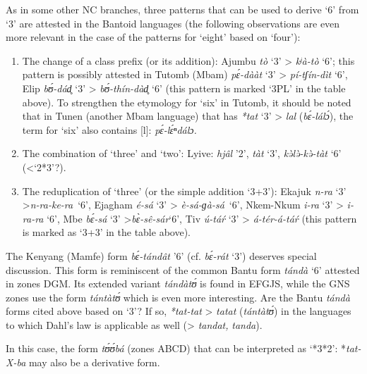 \newpage    
As in some other NC branches, three patterns that can be used to derive `6' from `3' are attested in the Bantoid languages (the following observations are even more relevant in the case of the patterns for `eight' based on `four'):

\begin{enumerate}
\item The change of a class prefix (or its addition): Ajumbu \textit{tò} ‘3’ > \textit{kʲà-tò} ‘6’; this pattern is possibly attested in Tutomb (Mbam) \textit{p{\'{ɛ}}-dààt} ‘3’ > \textit{pí-tʃín-dìt} ‘6’, Elip \textit{b{\'{ʊ}}-dád̥} ‘3’ > \textit{b{\'{ʊ}}-thín-dàd̥} ‘6’ (this pattern is marked ‘3PL’ in the table above). To strengthen the etymology for `six' in Tutomb, it should be noted that in Tunen (another Mbam language) that has \textit{*tat} ‘3’ > \textit{lal} (\textit{b{\'{ɛ}}-lál{\'{ɔ}}}), the term for `six' also contains [l]: \textit{p{\'{ɛ}}-l{\'{ɛ}}ⁿdálɔ.}
  
\item The combination of `three' and `two': Lyive: \textit{hjâl} ’2’, \textit{tàt} ‘3’, \textit{k{\`{ə}}l{\`{ə}}-k{\`{ə}}-tàt} ‘6’ (<‘2*3’?).
\item The reduplication of `three' (or the simple addition ‘3+3’): Ekajuk \textit{n-ra} ‘3’ >\textit{n-ra-ke-ra}~‘6’, Ejagham \textit{é-sá} ‘3’ > \textit{è-sá-ɡà-sá}~‘6’, Nkem-Nkum \textit{i-ra} ‘3’ > \textit{i-ra-ra} ‘6’, Mbe \textit{b{\'{ɛ}}-sá} ‘3’ >\textit{b{\`{ɛ}}-s{\^{e}}-sár}‘6’, Tiv \textit{ú-tá{\'{r}}} ‘3’ > \textit{á-tér-á-tá{\'{r}}} (this pattern is marked as ‘3+3’ in the table above). 
\end{enumerate}
The Kenyang (Mamfe) form \textit{b{\'{ɛ}}-tándât} ’6’ (cf. \textit{b{\'{ɛ}}-rát} ‘3’) deserves special discussion. This form is reminiscent of the common Bantu form \textit{tándà} ‘6’ attested in zones DGM. Its extended variant \textit{tándàt{\'{ʊ}}} is found in EFGJS, while the GNS zones use the form \textit{tántàt{\'{ʊ}}} which is even more interesting. Are the Bantu \textit{tándà} forms cited above based on `3'?  If so, \textit{*tat-tat} > \textit{tatat} (\textit{tántàt{\'{ʊ}}}) in the languages to which Dahl's law is applicable as well (> \textit{tandat,} \textit{tanda}).

In this case, the form \textit{t{\'{ʊ}}{\'{ʊ}}bá} (zones ABCD) that can be interpreted as ‘*3*2’: *\textit{tat-X-ba} may also be a derivative form.  

